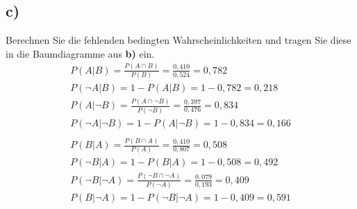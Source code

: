 \documentclass[12pt, a4paper]{article}
\begin{document}
\subsection*{c)}
Berechnen Sie die fehlenden bedingten Wahrscheinlichkeiten und tragen Sie diese in die Baumdiagramme aus \textbf{b)} ein.
\begin{align}
P(A | B) = \frac{P(A \cap B)}{P(B)} = \frac{0,410}{0,524} = 0,782 \\
P(\neg A | B) = 1 - P(A | B) = 1 - 0,782 = 0,218 \\
P(A | \neg B) = \frac{P(A \cap \neg B)}{P(\neg B)} = \frac{0,397}{0,476} = 0,834 \\
P(\neg A | \neg B) = 1 - P(A | \neg B) = 1 - 0,834 = 0,166 \\\\
P(B | A) = \frac{P(B \cap A)}{P(A)} = \frac{0,410}{0,807} = 0,508 \\
P(\neg B | A) = 1 - P(B | A) = 1 - 0,508 = 0,492 \\
P(\neg B | \neg A) = \frac{P(\neg B \cap \neg A)}{P(\neg A)} = \frac{0,079}{0,193} = 0,409 \\
P(B | \neg A) = 1 - P(\neg B | \neg A) = 1 - 0,409 = 0,591
\end{align}
\vspace{0.3cm}
\end{document}
